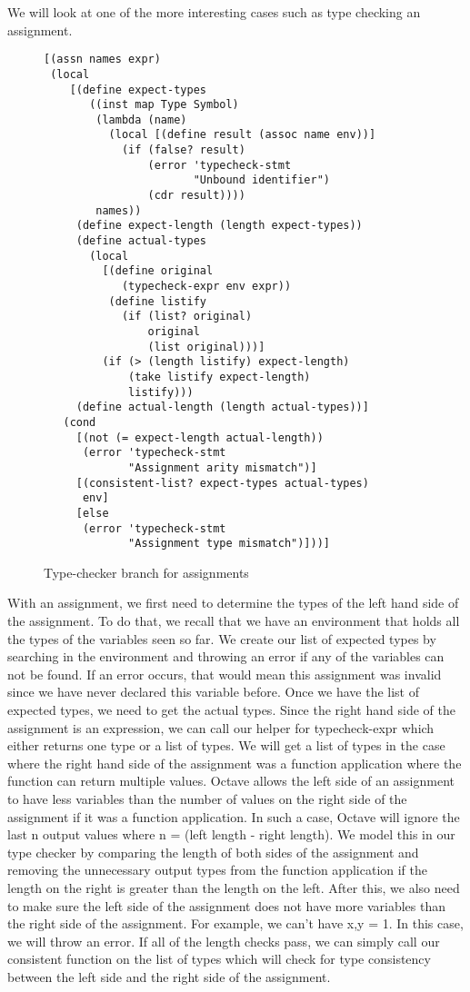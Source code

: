 We will look at one of the more interesting cases such as type checking an assignment.

\begin{figure}[h]
    \begin{lstlisting}[language=racket]
[(assn names expr)
 (local
    [(define expect-types
       ((inst map Type Symbol)
        (lambda (name)
          (local [(define result (assoc name env))]
            (if (false? result)
                (error 'typecheck-stmt
                       "Unbound identifier")
                (cdr result))))
        names))
     (define expect-length (length expect-types))
     (define actual-types
       (local
         [(define original
            (typecheck-expr env expr))
          (define listify
            (if (list? original)
                original
                (list original)))]
         (if (> (length listify) expect-length)
             (take listify expect-length)
             listify)))
     (define actual-length (length actual-types))]
   (cond
     [(not (= expect-length actual-length))
      (error 'typecheck-stmt
             "Assignment arity mismatch")]
     [(consistent-list? expect-types actual-types)
      env]
     [else
      (error 'typecheck-stmt
             "Assignment type mismatch")]))]
    \end{lstlisting}
    \caption[]{Type-checker branch for assignments}
    \label{fig:assn}
\end{figure}

With an assignment, we first need to determine the types of the left hand side of the assignment. To do that, we recall that we have an environment that holds all the types of the variables seen so far. We create our list of expected types by searching in the environment and throwing an error if any of the variables can not be found. If an error occurs, that would mean this assignment was invalid since we have never declared this variable before. Once we have the list of expected types, we need to get the actual types. Since the right hand side of the assignment is an expression, we can call our helper for typecheck-expr which either returns one type or a list of types. We will get a list of types in the case where the right hand side of the assignment was a function application where the function can return multiple values. Octave allows the left side of an assignment to have less variables than the number of values on the right side of the assignment if it was a function application. In such a case, Octave will ignore the last n output values where n = (left length - right length). We model this in our type checker by comparing the length of both sides of the assignment and removing the unnecessary output types from the function application if the length on the right is greater than the length on the left. After this, we also need to make sure the left side of the assignment does not have more variables than the right side of the assignment. For example, we can't have x,y = 1. In this case, we will throw an error. If all of the length checks pass, we can simply call our consistent function on the list of types which will check for type consistency between the left side and the right side of the assignment.  

